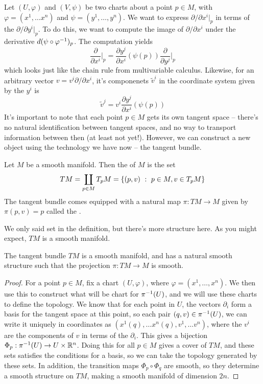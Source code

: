 Let $(U, \varphi)$ and $(V, \psi)$ be two charts about a point $p \in M$, with
$\varphi = (x^1, \ldots x^n)$ and $\psi = (y^1, \ldots, y^n)$.
We want to express $\partial/\partial x^i\vert_p$ in terms of the
$\partial/\partial y^i\vert_p$. To do this, we want to compute the image of
$\partial / \partial x^i$ under the derivative $d(\psi \circ \varphi^{-1})_p$.
The computation yields
$$\frac{\partial}{\partial x^i}\bigg\vert_p =
\frac{\partial y^j}{\partial x^i}(\psi(p)) \frac{\partial}{\partial y^j}\bigg\vert_p$$
which looks just like the chain rule from multivariable calculus. Likewise,
for an arbitrary vector $v = v^i \partial / \partial x^i$, it's componenets
$\tilde{v}^i$ in the coordinate system given by the $y^i$ is
$$\tilde{v}^j = v^i\frac{\partial y^j}{\partial x^i}(\psi(p)) $$
%
It's important to note that each point $p \in M$ gets its own tangent
space -- there's no natural identification between tangent spaces, and
no way to transport information between then (at least not yet!).
However, we can construct a new object using the technology we have
now -- the tangent bundle.
\begin{defn}
	Let $M$ be a smooth manifold. Then the  of $M$ is
	the set
	$$TM = \coprod_{p \in M} T_pM = \left\lbrace (p,v) ~:~ p \in M, v \in T_pM \right\rbrace $$
	The tangent bundle comes equipped with a natural map $\pi : TM \to M$
	given by $\pi(p,v) = p$ called the .
\end{defn}
%
We only said set in the definition, but there's more structure here. As
you might expect, $TM$ is a smooth manifold.
%
\begin{thm}
	The tangent bundle $TM$ is a smooth manifold, and has a natural smooth
	structure such that the projection $\pi : TM \to M$ is smooth.
\end{thm}
%
\begin{proof}
For a point $p \in M$, fix a chart $(U, \varphi)$, where
$\varphi = (x^1, \ldots, x^n)$. We then use this to
construct what will be chart for $\pi^{-1}(U)$, and we will use these
charts to define the topology. We know that for each point in $U$, the
vectors $\partial_i$ form a basis for the tangent space at this point,
so each pair $(q,v) \in \pi^{-1}(U)$, we can write it uniquely in
coordinates as $(x^1(q), \ldots x^n(q), v^1, \ldots v^n)$, where the
$v^i$ are the components of $v$ in terms of the $\partial_i$. This gives
a bijection $\Phi_p : \pi^{-1}(U) \to U \times \mathbb{R}^n$. Doing this for
all $p \in M$ gives a cover of $TM$, and these sets satisfies the
conditions for a basis, so we can take the topology generated by these
sets. In addition, the transition maps $\Phi_p \circ \Phi_q$ are smooth,
so they determine a smooth structure on $TM$, making a smooth manifold
of dimension $2n$.
\end{proof}
